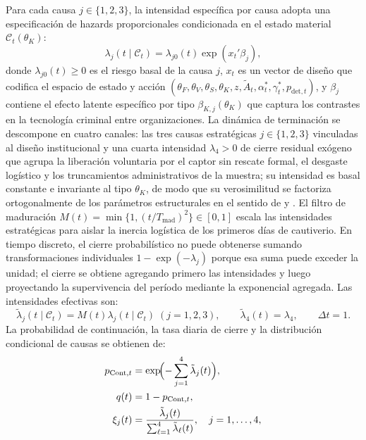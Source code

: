 \documentclass[review,authoryear,12pt]{elsarticle}
\theoremstyle{plain}
\theoremstyle{definition}
\newcommand{\1}{\mathbf{1}}
\begin{document}
Para cada causa $j\in\{1,2,3\}$, la intensidad específica por causa adopta una especificación de hazards proporcionales condicionada en el estado material $\mathcal{C}_t(\theta_K)$:
\begin{equation}
\lambda_j(t\mid\mathcal{C}_t)=\lambda_{j0}(t)\exp(x_t'\beta_j),
\label{eq:lambda-j}
\end{equation}
donde $\lambda_{j0}(t)\ge 0$ es el riesgo basal de la causa $j$, $x_t$ es un vector de diseño que codifica el espacio de estado y acción $(\theta_F,\theta_V,\theta_S,\theta_K,z,\tilde{A}_t,\alpha_t^\ast,\gamma_t^\ast,p_{\mathrm{det},t})$, y $\beta_j$ contiene el efecto latente específico por tipo $\beta_{K,j}(\theta_K)$ que captura los contrastes en la tecnología criminal entre organizaciones. La dinámica de terminación se descompone en cuatro canales: las tres causas estratégicas $j\in\{1,2,3\}$ vinculadas al diseño institucional y una cuarta intensidad $\lambda_4>0$ de cierre residual exógeno que agrupa la liberación voluntaria por el captor sin rescate formal, el desgaste logístico y los truncamientos administrativos de la muestra; su intensidad es basal constante e invariante al tipo $\theta_K$, de modo que su verosimilitud se factoriza ortogonalmente de los parámetros estructurales en el sentido de \citet{Lancaster1990} y \citet{AbbringVanDenBerg2003}. El filtro de maduración $M(t)=\min\{1,(t/T_{\mathrm{mad}})^2\}\in[0,1]$ escala las intensidades estratégicas para aislar la inercia logística de los primeros días de cautiverio. En tiempo discreto, el cierre probabilístico no puede obtenerse sumando transformaciones individuales $1-\exp(-\lambda_j)$ porque esa suma puede exceder la unidad; el cierre se obtiene agregando primero las intensidades y luego proyectando la supervivencia del período mediante la exponencial agregada. Las intensidades efectivas son:
\begin{equation}
\tilde{\lambda}_j(t\mid\mathcal{C}_t)=M(t)\lambda_j(t\mid\mathcal{C}_t)\;(j=1,2,3),\qquad\tilde{\lambda}_4(t)=\lambda_4,\qquad\Delta t=1.
\label{eq:hj}
\end{equation}
La probabilidad de continuación, la tasa diaria de cierre y la distribución condicional de causas se obtienen de:
\begin{align}
p_{\mathrm{Cont},t} &= \exp\!\Bigl(-\sum_{j=1}^{4}\tilde{\lambda}_j(t)\Bigr),\label{eq:pCont}\\
q(t) &= 1-p_{\mathrm{Cont},t},\label{eq:q}\\
\xi_j(t) &= \frac{\tilde{\lambda}_j(t)}{\sum_{\ell=1}^{4}\tilde{\lambda}_\ell(t)},\quad j=1,\ldots,4,\label{eq:xi}
\end{align}
\end{document}
